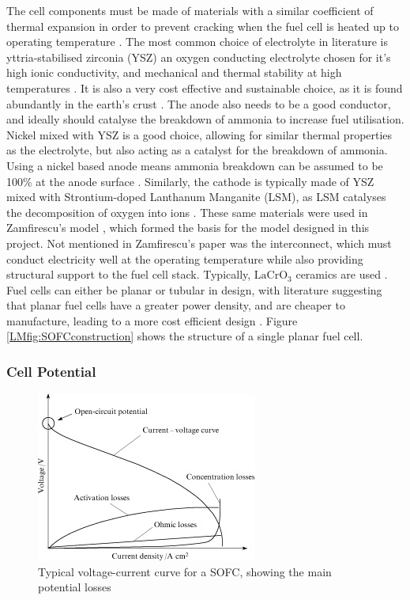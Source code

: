     
    The cell components must be made of materials with a similar coefficient of thermal expansion in order to prevent cracking when the fuel cell is heated up to operating temperature \cite{LM2}. The most common choice of electrolyte in literature is yttria-stabilised zirconia (YSZ) \text{-} an oxygen conducting electrolyte \text{-} chosen for it's high ionic conductivity, and mechanical and thermal stability at high temperatures \cite{PR7}. It is also a very cost effective and sustainable choice, as it is found abundantly in the earth's crust \cite{LM10}. The anode also needs to be a good conductor, and ideally should catalyse the breakdown of ammonia to increase fuel utilisation. Nickel mixed with YSZ is a good choice, allowing for similar thermal properties as the electrolyte, but also acting as a catalyst for the breakdown of ammonia. Using a nickel based anode means ammonia breakdown can be assumed to be 100\% at the anode surface \cite{LM2}. Similarly, the cathode is typically made of YSZ mixed with Strontium-doped Lanthanum Manganite (LSM), as LSM catalyses the decomposition of oxygen into ions \cite{PR7}. These same materials were used in Zamfirescu's model \cite{LM5}, which formed the basis for the model designed in this project. Not mentioned in Zamfirescu's paper was the interconnect, which must conduct electricity well at the operating temperature while also providing structural support to the fuel cell stack.  Typically, $\text{LaCrO}_{3}$ ceramics are used \cite{LM10}. Fuel cells can either be planar or tubular in design, with literature suggesting that planar fuel cells have a greater power density, and are cheaper to manufacture, leading to a more cost efficient design \cite{LM2}. Figure \ref{LMfig:SOFCconstruction} shows the structure of a single planar fuel cell.
    
    
    \subsubsection{Cell Potential}
    
\begin{figure}[h]
    \centering
    \includegraphics{voltagecurve.jpg}
    \caption{Typical voltage-current curve for a SOFC, showing the main potential losses \cite{LM9}}
    \label{LMfig:SOFCvoltagecurve}
\end{figure}
    
